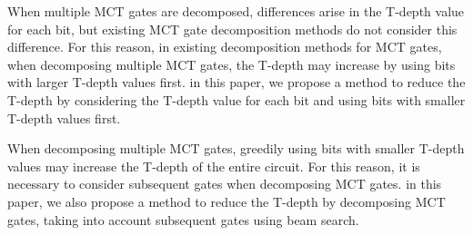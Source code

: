 \par
When multiple MCT gates are decomposed, differences arise in the T-depth value for each bit, but
existing MCT gate decomposition methods\cite{abdessaied2016technology,niemann2019t,baker2019decomposing} do not consider this difference. 
For this reason, in existing decomposition methods for MCT gates,
when decomposing multiple MCT gates, the T-depth may increase by using bits with larger T-depth values first.
 in this paper, we propose a method to reduce the T-depth by considering the T-depth value for each bit and
using bits with smaller T-depth values first.
\par
When decomposing multiple MCT gates, greedily using bits with smaller T-depth values may increase the T-depth of the entire circuit.
For this reason, it is necessary to consider subsequent gates when decomposing MCT gates.
 in this paper, we also propose a method to reduce the T-depth by decomposing MCT gates, taking into account subsequent gates using beam search.
